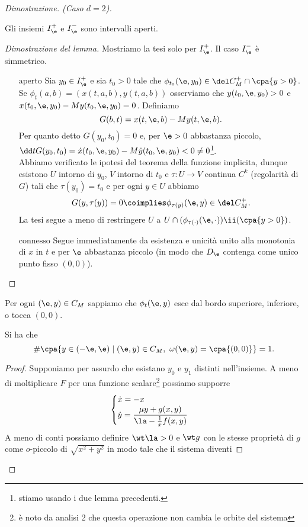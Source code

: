 \begin{proof}[Dimostrazione. (Caso $d=2$)]
\begin{lemma}
Gli insiemi $I_\e^+$ e $I_\e^-$ sono intervalli aperti.
\end{lemma}
\begin{proof}[Dimostrazione del lemma]
Mostriamo la tesi solo per $I_\e^+$. Il caso $I_\e^-$ \`e simmetrico.
\setlength{\leftmargini}{0cm}
\begin{itemize}
\item[$\boxed{\text{aperto}}$] Sia $y_0\in I_\e^+$ e sia $t_0>0$ tale che $\phi_{t_0}(\e,y_0)\in \del C_M^+\cap\cpa{y>0}$. Se $\phi_t(a,b)=(x(t,a,b),y(t,a,b))$ osserviamo che $y(t_0,\e,y_0)>0$ e $x(t_0,\e,y_0)-My(t_0,\e,y_0)=0$. Definiamo
\[G(b,t)=x(t,\e,b)-My(t,\e,b).\]
Per quanto detto $G(y_0,t_0)=0$ e, per $\e>0$ abbastanza piccolo, $\dd t{}G(y_0,t_0)=\dot x(t_0,\e,y_0)-M\dot y(t_0,\e,y_0)<0\neq 0$\footnote{stiamo usando i due lemma precedenti.}.\\
Abbiamo verificato le ipotesi del teorema della funzione implicita, dunque esistono $U$ intorno di $y_0$, $V$ intorno di $t_0$ e $\tau:U\to V$ continua $C^k$ (regolarit\`a di $G$) tali che $\tau(y_0)=t_0$ e per ogni $y\in U$ abbiamo
\[G(y,\tau(y))=0\coimplies \phi_{\tau(y)}(\e,y)\in \del C_M^+.\]
La tesi segue a meno di restringere $U$ a $U\cap (\phi_{\tau(\cdot)}(\e,\cdot))\ii(\cpa{y>0})$.
\item[$\boxed{\text{connesso}}$] Segue immediatamente da esistenza e unicit\`a unito alla monotonia di $x$ in $t$ e per $\e$ abbastanza piccolo (in modo che $D_\e$ contenga come unico punto fisso $(0,0)$). 
\end{itemize}
\setlength{\leftmargini}{0.5cm}
\end{proof}
\noindent
Per ogni $(\e,y)\in C_M$ sappiamo che $\phi_t(\e,y)$ esce dal bordo superiore, inferiore, o tocca $(0,0)$.
\begin{lemma}
Si ha che
\[\#\cpa{y\in(-\e,\e)\mid (\e,y)\in C_M,\ \omega(\e,y)=\cpa{(0,0)}}=1.\]
\end{lemma}
\begin{proof}
Supponiamo per assurdo che esistano $y_0$ e $y_1$ distinti nell'insieme. A meno di moltiplicare $F$ per una funzione scalare\footnote{\`e noto da analisi 2 che questa operazione non cambia le orbite del sistema} possiamo supporre
\[\begin{cases}
\dot x=-x\\
\displaystyle\dot y=\frac{\mu y+g(x,y)}{\la-\frac1xf(x,y)}
\end{cases}\]
A meno di conti possiamo definire $\wt \la>0$ e $\wt g$ con le stesse propriet\`a di $g$ come $o$-piccolo di $\sqrt{x^2+y^2}$ in modo tale che il sistema diventi

\end{proof}
\end{proof}
